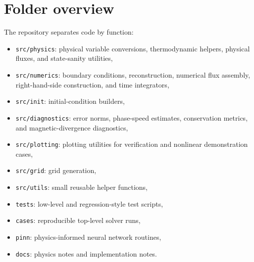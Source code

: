 \documentclass[11pt]{article}
\begin{document}
\section{Folder overview}
The repository separates code by function:
\begin{itemize}[leftmargin=1.8em]
    \item \texttt{src/physics}: physical variable conversions, thermodynamic helpers, physical fluxes, and state-sanity utilities,
    \item \texttt{src/numerics}: boundary conditions, reconstruction, numerical flux assembly, right-hand-side construction, and time integrators,
    \item \texttt{src/init}: initial-condition builders,
    \item \texttt{src/diagnostics}: error norms, phase-speed estimates, conservation metrics, and magnetic-divergence diagnostics,
    \item \texttt{src/plotting}: plotting utilities for verification and nonlinear demonstration cases,
    \item \texttt{src/grid}: grid generation,
    \item \texttt{src/utils}: small reusable helper functions,
    \item \texttt{tests}: low-level and regression-style test scripts,
    \item \texttt{cases}: reproducible top-level solver runs,
    \item \texttt{pinn}: physics-informed neural network routines,
    \item \texttt{docs}: physics notes and implementation notes.
\end{itemize}
\end{document}

